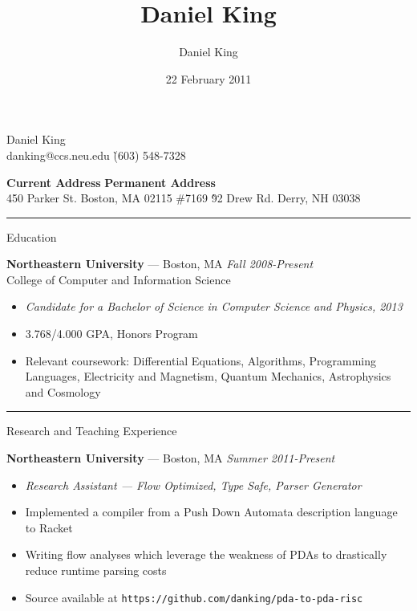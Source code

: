 \documentclass[10pt]{letter}
\author{Daniel King}
\title{Daniel King}
\date{22 February 2011}
\begin{document}
\begin{tabbing}{\Huge Daniel King} \\
\normalsize danking@ccs.neu.edu \`(603) 548-7328
\end{tabbing}

\vspace{-10pt}
\begin{tabbing}
\textbf{Current Address} \`\textbf{Permanent Address}\\
450 Parker St. Boston, MA 02115 \#7169 \`92 Drew Rd. Derry, NH 03038
\end{tabbing}\vspace{-15pt}
\rule{\linewidth}{.5pt}

{\Large Education}
\begin{tabbing}
{\large \bf Northeastern University} --- Boston, MA \` \textit{Fall 2008-Present} \\
College of Computer and Information Science
\end{tabbing}\vspace{-10pt}

\begin{itemize}
\setlength\itemsep{1pt}
\item [] {\textit{Candidate for a Bachelor of Science in Computer Science and
    Physics, 2013}}
\item{3.768/4.000 GPA, Honors Program}
\item{Relevant coursework: Differential Equations, Algorithms, Programming
  Languages, Electricity and Magnetism, Quantum Mechanics, Astrophysics and Cosmology}
\end{itemize}

\rule{\linewidth}{.5pt}

{\Large Research and Teaching Experience}

\begin{tabbing}
{\large \bf Northeastern University} --- Boston, MA \` \textit{Summer 2011-Present}

\end{tabbing}
\begin{itemize}
\setlength\itemsep{1pt}
\item [] {\textit{Research Assistant --- Flow Optimized, Type Safe, Parser
    Generator}}
\item{Implemented a compiler from a Push Down Automata description language to Racket}
\item{Writing flow analyses which leverage the weakness of PDAs to drastically
  reduce runtime parsing costs}
\item{Source available at \texttt{https://github.com/danking/pda-to-pda-risc}}
\end{itemize}
\end{document}
